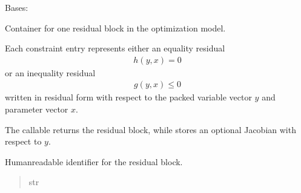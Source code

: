 \documentclass[letterpaper,10pt,english,openany,oneside]{sphinxmanual}
\begin{document}
\begin{fulllineitems}

\pysigstartsignatures
{}
\pysigstopsignatures
\sphinxAtStartPar
Bases: 

\sphinxAtStartPar
Container for one residual block in the optimization model.

\sphinxAtStartPar
Each constraint entry represents either an equality residual
\begin{equation*}
\begin{split}h(y, x) = 0\end{split}
\end{equation*}
\sphinxAtStartPar
or an inequality residual
\begin{equation*}
\begin{split}g(y, x) \le 0\end{split}
\end{equation*}
\sphinxAtStartPar
written in residual form with respect to the packed variable vector
\(y\) and parameter vector \(x\).

\sphinxAtStartPar
The  callable returns the residual block, while  stores
an optional Jacobian with respect to \(y\).


\begin{fulllineitems}

\pysigstartsignatures
{}
\pysigstopsignatures
\sphinxAtStartPar
Human\sphinxhyphen{}readable identifier for the residual block.
\begin{quote}\begin{description}
\sphinxAtStartPar
str


\end{description}
\end{quote}
\end{fulllineitems}
\end{fulllineitems}
\end{document}
